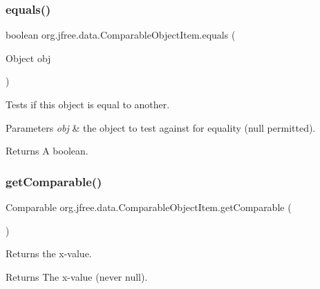 \subsubsection{\texorpdfstring{equals()}{equals()}}
{\footnotesize\ttfamily boolean org.\+jfree.\+data.\+Comparable\+Object\+Item.\+equals (\begin{DoxyParamCaption}\item[{Object}]{obj }\end{DoxyParamCaption})}

Tests if this object is equal to another.


\begin{DoxyParams}{Parameters}
{\em obj} & the object to test against for equality ({\ttfamily null} permitted).\\
\hline
\end{DoxyParams}
\begin{DoxyReturn}{Returns}
A boolean. 
\end{DoxyReturn}
\mbox{\label{classorg_1_1jfree_1_1data_1_1_comparable_object_item_a556e4d2a9316c144862b0babf6a632d8}} 
\subsubsection{\texorpdfstring{get\+Comparable()}{getComparable()}}
{\footnotesize\ttfamily Comparable org.\+jfree.\+data.\+Comparable\+Object\+Item.\+get\+Comparable (\begin{DoxyParamCaption}{ }\end{DoxyParamCaption})\hspace{0.3cm}{\ttfamily [protected]}}

Returns the x-\/value.

\begin{DoxyReturn}{Returns}
The x-\/value (never {\ttfamily null}). 
\end{DoxyReturn}
\mbox{\label{classorg_1_1jfree_1_1data_1_1_comparable_object_item_a6bbc1d079e7780d0435f018e44748866}} 
